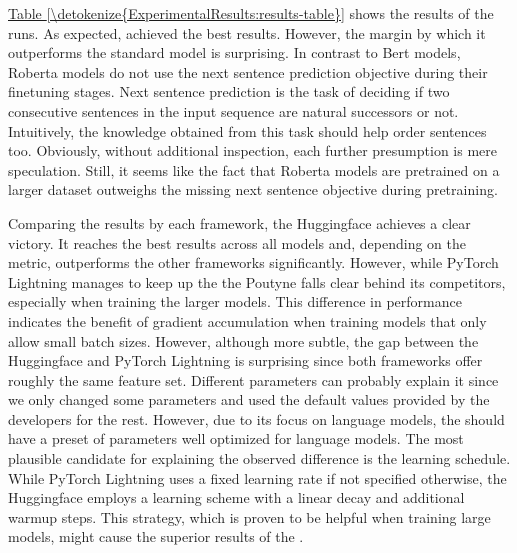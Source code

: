 \documentclass[letterpaper,10pt,english]{jupyterBook}
\begin{document}
\sphinxAtStartPar
\hyperref[\detokenize{ExperimentalResults:results-table}]{Table \ref{\detokenize{ExperimentalResults:results-table}}} shows the results of the runs. As expected,  achieved the best results. However, the margin by which it outperforms the standard  model is surprising. In contrast to Bert models, Roberta models do not use the next sentence prediction objective during their finetuning stages. Next sentence prediction is the task of deciding if two consecutive sentences in the input sequence are natural successors or not. Intuitively, the knowledge obtained from this task should help order sentences too. Obviously, without additional inspection, each further presumption is mere speculation. Still, it seems like the fact that Roberta models are pretrained on a larger dataset outweighs the missing next sentence objective during pretraining.



\sphinxAtStartPar
Comparing the results by each framework, the Huggingface  achieves a clear victory. It reaches the best results across all models and, depending on the metric, outperforms the other frameworks significantly. However, while PyTorch Lightning manages to keep up the the  Poutyne falls clear behind its competitors, especially when training the larger models.
This difference in performance indicates the benefit of gradient accumulation when training models that only allow small batch sizes.
However, although more subtle, the gap between the Huggingface  and PyTorch Lightning is surprising since both frameworks offer roughly the same feature set.
Different parameters can probably explain it since we only changed some parameters and used the default values provided by the developers for the rest.
However, due to its focus on language models, the  should have a preset of parameters well optimized for language models.
The most plausible candidate for explaining the observed difference is the learning schedule. While PyTorch Lightning uses a fixed learning rate if not specified otherwise, the Huggingface  employs a learning scheme with a linear decay and additional warmup steps. This strategy, which is proven to be helpful when training large models, might cause the superior results of the .
\end{document}
